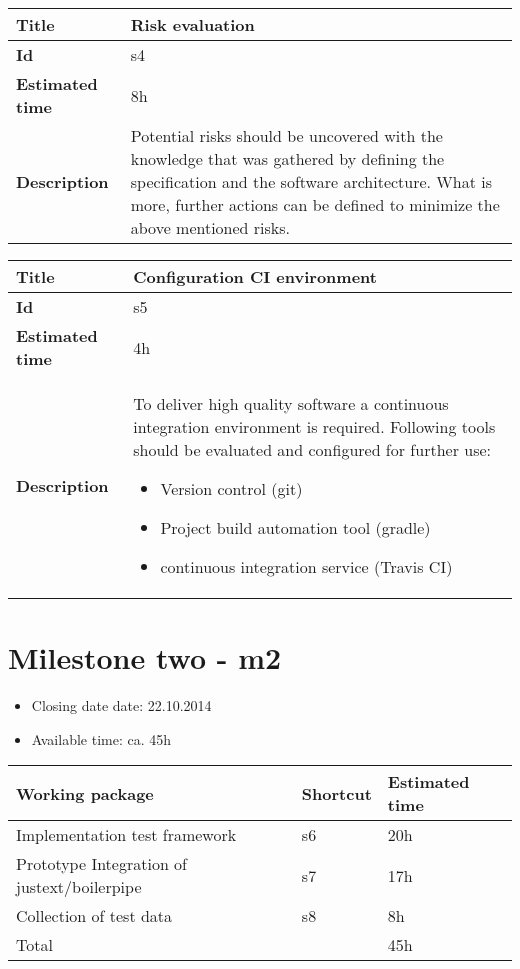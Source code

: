     \begin{tabular}{ | p{4cm} | p{10cm} |}
    \hline
    \textbf{Title} & Risk evaluation\\ \hline
    \textbf{Id} & s4\\ \hline
    \textbf{Estimated time} & 8h \\ \hline
    \textbf{Description} & Potential risks should be uncovered with the knowledge that was gathered by defining the specification and the software architecture. What is more, further actions can be defined to minimize the above mentioned risks.\\
    \hline
    \end{tabular}
    

    \begin{tabular}{ | p{4cm} | p{10cm} |}
    \hline
    \textbf{Title} & Configuration CI environment\\ \hline
    \textbf{Id} & s5\\ \hline
    \textbf{Estimated time} & 4h \\ \hline
    \textbf{Description} & To deliver high quality software a continuous integration environment is required. Following tools should be evaluated and configured for further use:
    \begin{itemize}
        \item Version control (git)
        \item Project build automation tool (gradle)
        \item continuous integration service (Travis CI)
    \end{itemize}
    \\
    \hline
    \end{tabular}


\section{Milestone two - m2}

\begin{itemize}
\item Closing date date: 22.10.2014
\item Available time: ca. 45h
\end{itemize}

    \begin{tabular}{ | p{10cm} | p{2cm} | p{2cm} |}
    \hline
    \textbf{Working package} & \textbf{Shortcut}& \textbf{Estimated time} \\ \hline
    Implementation test framework & s6 & 20h \\
    Prototype Integration of justext/boilerpipe & s7 & 17h \\
    Collection of test data & s8 & 8h \\ \hline
    Total &  & 45h\\
    \hline
    \end{tabular}


